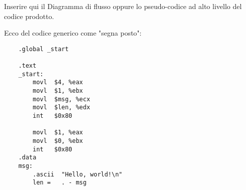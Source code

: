 \documentclass[../Relazione.tex]{subfiles}
\begin{document}
Inserire qui il Diagramma
di flusso oppure lo pseudo-codice ad alto livello
del codice prodotto.

Ecco del codice generico come "segna posto":

\begin{verbatim}
    .global _start

    .text
    _start:
        movl  $4, %eax
        movl  $1, %ebx
        movl  $msg, %ecx
        movl  $len, %edx
        int   $0x80

        movl  $1, %eax
        movl  $0, %ebx
        int   $0x80
    .data
    msg:
        .ascii  "Hello, world!\n"
        len =   . - msg
\end{verbatim}
\end{document}
